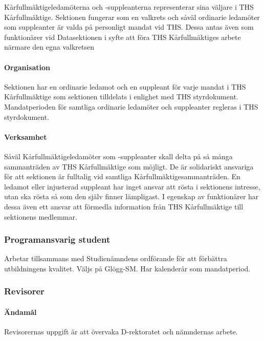 \documentclass{dgovdoc}
\begin{document}
Kårfullmäktigeledamöterna och -suppleanterna representerar sina väljare i
THS Kårfullmäktige. Sektionen fungerar som en valkrets och såväl ordinarie ledamöter
som suppleanter är valda på personligt mandat vid THS. Dessa antas även som funktionärer
vid Datasektionen i syfte att föra THS Kårfullmäktiges arbete närmare den
egna valkretsen

\paragraph{Organisation}

Sektionen har en ordinarie ledamot och en suppleant för varje mandat i THS Kårfullmäktige
som sektionen tilldelats i enlighet med THS styrdokument. Mandatperioden för samtliga
ordinarie ledamöter och suppleanter regleras i THS styrdokument.

\paragraph{Verksamhet}

Såväl Kårfullmäktigeledamöter som -suppleanter skall delta på så många sammanträden
av THS Kårfullmäktige som möjligt. De är solidariskt ansvariga för att sektionen
är fulltalig vid samtliga Kårfullmäktigesammanträden. En ledamot eller injusterad suppleant
har inget ansvar att rösta i sektionens intresse, utan ska rösta så som den själv
finner lämpligast. I egenskap av funktionärer har dessa även ett ansvar att förmedla
information från THS Kårfullmäktige till sektionens medlemmar.

\subsubsection{Programansvarig student}

Arbetar tillsammans med Studienämndens ordförande för att förbättra
utbildningens kvalitet. Väljs på Glögg-SM. Har kalenderår som mandatperiod.

\subsubsection{Revisorer}

\paragraph{Ändamål}

Revisorernas uppgift är att övervaka D-rektoratet och nämndernas arbete.
\end{document}

